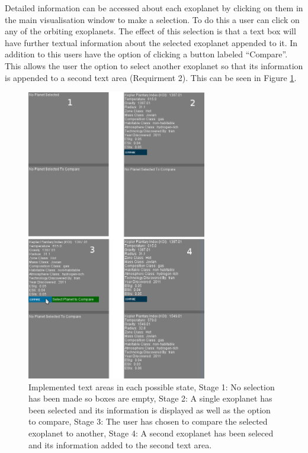 Detailed information can be accessed about each exoplanet by clicking on them in
the main visualisation window to
make a selection. To do this a user can click on any of the orbiting exoplanets.
The effect of this selection is that a text box will have further textual
information about the selected exoplanet appended to it. In addition to this
users have the option of clicking a button labeled ``Compare''. This allows
the user the option to select another exoplanet so that its information is
appended to a second text area (Requirment 2). This can be seen in Figure
\ref{fig:textBoxes}. 
\begin{figure}[H]
  \centering
      \includegraphics[width=0.7\textwidth]{images/textBoxes.jpg}
  \caption[Implemented text areas in each possible state]{Implemented text areas
in each possible state, Stage 1: No selection has been made so boxes are empty,
Stage 2: A single exoplanet has been selected and its information is displayed
as well as the option to compare, Stage 3: The user has chosen to compare the
selected exoplanet to another, Stage 4: A second exoplanet has been seleced and
its information added to the second text area.}
  \label{fig:textBoxes}
\end{figure}
